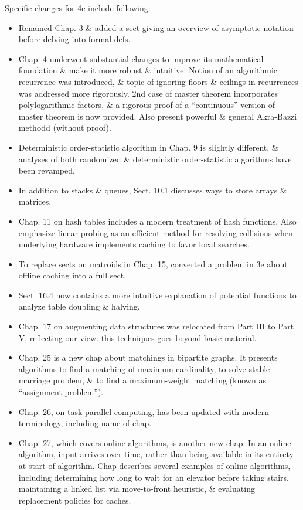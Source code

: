 \documentclass{article}
\begin{document}
\begin{itemize}
\begin{itemize}
\begin{itemize}
		\end{itemize}
		Specific changes for 4e include following:
		\begin{itemize}
			\item Renamed Chap. 3 \& added a sect giving an overview of asymptotic notation before delving into formal defs.
			\item Chap. 4 underwent substantial changes to improve its mathematical foundation \& make it more robust \& intuitive. Notion of an algorithmic recurrence was introduced, \& topic of ignoring floors \& ceilings in recurrences was addressed more rigorously. 2nd case of master theorem incorporates polylogarithmic factors, \& a rigorous proof of a ``continuous'' version of master theorem is now provided. Also present powerful \& general Akra-Bazzi methodd (without proof).
			\item Deterministic order-statistic algorithm in Chap. 9 is slightly different, \& analyses of both randomized \& deterministic order-statistic algorithms have been revamped.
			\item In addition to stacks \& queues, Sect. 10.1 discusses ways to store arrays \& matrices.
			\item Chap. 11 on hash tables includes a modern treatment of hash functions. Also emphasize linear probing as an efficient method for resolving collisions when underlying hardware implements caching to favor local searches.
			\item To replace sects on matroids in Chap. 15, converted a problem in 3e about offline caching into a full sect.
			\item Sect. 16.4 now contains a more intuitive explanation of potential functions to analyze table doubling \& halving.
			\item Chap. 17 on augmenting data structures was relocated from Part III to Part V, reflecting our view: this techniques goes beyond basic material.
			\item Chap. 25 is a new chap about matchings in bipartite graphs. It presents algorithms to find a matching of maximum cardinality, to solve stable-marriage problem, \& to find a maximum-weight matching (known as ``assignment problem'').
			\item Chap. 26, on task-parallel computing, has been updated with modern terminology, including name of chap.
			\item Chap. 27, which covers online algorithms, is another new chap. In an online algorithm, input arrives over time, rather than being available in its entirety at start of algorithm. Chap describes several examples of online algorithms, including determining how long to wait for an elevator before taking stairs, maintaining a linked list via move-to-front heuristic, \& evaluating replacement policies for caches.

\end{itemize}
\end{itemize}
\end{itemize}
\end{document}
